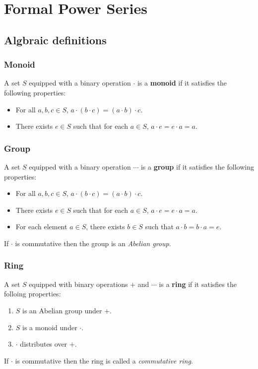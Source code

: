 \chapter{Formal Power Series}
\section{Algbraic definitions}
\subsection*{Monoid}
A set \(S\) equipped with a binary operation \(\cdot\) is a \textbf{monoid} if it satisfies the following properties:
\begin{itemize}
    \item For all \(a,b,c \in S\), \(a\cdot (b\cdot c) = (a\cdot b) \cdot c\).
    \item There exists \(e \in S\) such that for each \(a \in S\), \(a \cdot e = e \cdot a = a\).
\end{itemize}
\subsection*{Group}
A set \(S\) equipped with a binary operation \(\cdots\) is a \textbf{group} if it satisfies the following properties:
\begin{itemize}
    \item For all \(a,b,c \in S\), \(a\cdot (b\cdot c) = (a\cdot b) \cdot c\).
    \item There exists \(e \in S\) such that for each \(a \in S\), \(a \cdot e = e \cdot a = a\).
    \item For each element \(a \in S\), there exists \(b \in S\) such that \(a \cdot b = b \cdot a = e\).
\end{itemize}
If \(\cdot\) is commutative then the group is an \textit{Abelian group}.
\subsection*{Ring}
A set \(S\) equipped with binary operations \(+\) and \(\cdots\) is a \textbf{ring} if it satisfies the folloing properties:
\begin{enumerate}
    \item \(S\) is an Abelian group under \(+\).
    \item \(S\) is a monoid under \(\cdot\).
    \item \(\cdot\) distributes over \(+\).
\end{enumerate}
If \(\cdot\) is commutative then the ring is called a \textit{commutative ring}.
